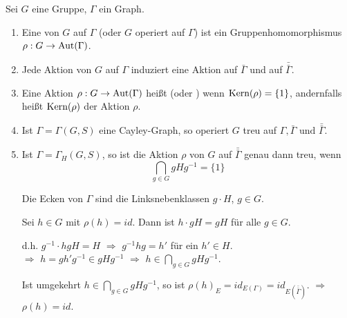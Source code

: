 \documentclass[a4paper, 10pt]{report}
\begin{document}
\begin{DefFolg} 
Sei $G$ eine Gruppe, $\Gamma$ ein Graph.
\begin{enumerate}
  \item Eine  von $G$ auf $\Gamma$ (oder $G$ operiert
  auf $\Gamma$) ist ein Gruppenhomomorphismus $\rho: G \to \mbox{Aut}(\Gamma)$.
  \item Jede Aktion von $G$ auf $\Gamma$ induziert eine Aktion auf
  $\bar{\Gamma}$ und auf $\bar{\bar{\Gamma}}$.
  \item Eine Aktion $\rho: G \to \mbox{Aut}(\Gamma)$ heißt 
  (oder ) wenn $\mbox{Kern}(\rho) = \{1\}$,
  andernfalls heißt $\mbox{Kern}(\rho)$
   der Aktion $\rho$.
  \item Ist $\Gamma = \Gamma(G,S)$ eine Cayley-Graph, so operiert $G$ treu auf
  $\Gamma, \bar{\Gamma} \textrm{ und }\bar{\bar{\Gamma}}$.
  \item Ist $\Gamma = \Gamma_H(G,S)$, so ist die Aktion $\rho$ von $G$ auf $\bar{\bar\Gamma}$ genau dann treu, wenn $$\bigcap_{g \in G} g H g^{-1} = \{1\}$$

\begin{Bew}
Die Ecken von $\Gamma$ sind die Linksnebenklassen $g \cdot H$, $g \in G$.

Sei $h \in G$ mit $\rho(h) = id$. Dann ist $h \cdot gH = gH$ f\"ur alle $g \in G$.

d.h. $g^{-1} \cdot h gH = H$ $\Rightarrow$ $g^{-1} h g = h'$ f\"ur ein $h' \in H$.\\
$\Rightarrow$ $h = g h' g^{-1} \in g H g^{-1}$ $\Rightarrow$ $h \in \bigcap_{g \in G} g H g^{-1}$.

Ist umgekehrt $h \in \bigcap_{g \in G} gHg^{-1}$, so ist $\rho(h)_E = id_{E(\Gamma)} = {id}_{E(\bar{\bar\Gamma})}$. $\Rightarrow$ $\rho(h) = id$.
\end{Bew}

\end{enumerate}
\end{DefFolg}
\end{document}
